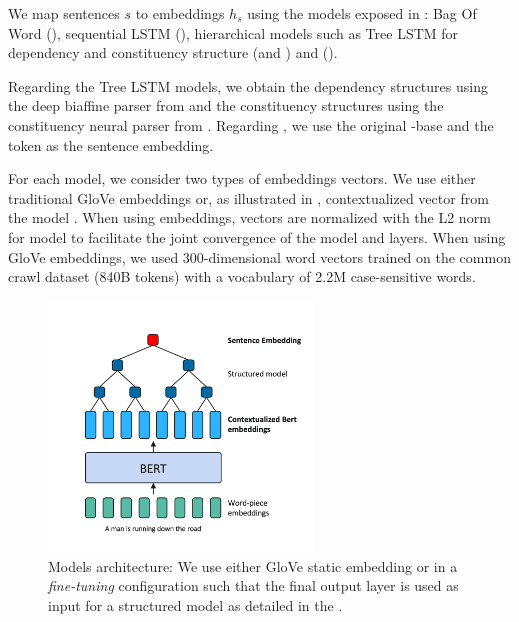 We map sentences $s$ to embeddings $h_s$ using the models exposed in : Bag Of Word (\bow), sequential LSTM (\seq),  hierarchical models such as Tree LSTM for dependency and constituency structure (\dep and \const) and \bert (\cls).

Regarding the Tree LSTM  models, we obtain the dependency structures using the deep biaffine parser from \textcite{dozat_17} and the constituency structures using the constituency neural parser from \textcite{klein_18}. Regarding \bert, we use the original \bert-base and the \cls token as the sentence embedding. 

For each model, we consider two types of embeddings vectors. We use either traditional GloVe embeddings \parencite{pennington_14} or, as illustrated in , contextualized vector from the \bert model \parencite{devlin_19}. When using \bert embeddings, vectors are normalized with the L2 norm for \bow model to facilitate the joint convergence of the model and \bert layers. When using GloVe embeddings, we used 300-dimensional word vectors trained on the common crawl dataset (840B tokens) with a vocabulary of 2.2M case-sensitive words.

\begin{figure}[!htb]
\begin{center}
\includegraphics[width=7cm]{images/model-struct.png}
\end{center}
\caption{Models architecture: We use either GloVe static embedding or \bert in a \textit{fine-tuning} configuration such that the final output layer is used as input for a structured model as detailed in the .}
\end{figure}

